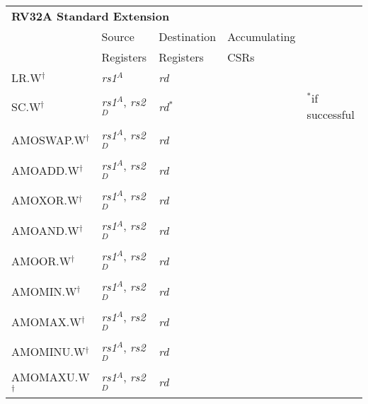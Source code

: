 \begin{tabular}{p{3cm}|p{25mm}|p{3cm}|p{4cm}|p{4cm}}
  \multicolumn{4}{l}{\bf RV32A Standard Extension} \\
  \cline{2-4}
   & Source    & Destination & Accumulating \\
   & Registers & Registers   & CSRs \\
  \cline{2-4}
   LR.W$^\dagger$ & {\em rs1}$^A$ & {\em rd} &   & \\
   \cline{2-4}
   SC.W$^\dagger$ & {\em rs1}$^A$, {\em rs2}$^D$ & {\em rd}$^*$ & & $^*$if successful  \\
   \cline{2-4}
   AMOSWAP.W$^\dagger$ & {\em rs1}$^A$, {\em rs2}$^D$ & {\em rd} &   & \\
   \cline{2-4}
   AMOADD.W$^\dagger$ & {\em rs1}$^A$, {\em rs2}$^D$ & {\em rd} &   & \\
   \cline{2-4}
   AMOXOR.W$^\dagger$ & {\em rs1}$^A$, {\em rs2}$^D$ & {\em rd} &   & \\
   \cline{2-4}
   AMOAND.W$^\dagger$ & {\em rs1}$^A$, {\em rs2}$^D$ & {\em rd} &   & \\
   \cline{2-4}
   AMOOR.W$^\dagger$ & {\em rs1}$^A$, {\em rs2}$^D$ & {\em rd} &   & \\
   \cline{2-4}
   AMOMIN.W$^\dagger$ & {\em rs1}$^A$, {\em rs2}$^D$ & {\em rd} &   & \\
   \cline{2-4}
   AMOMAX.W$^\dagger$ & {\em rs1}$^A$, {\em rs2}$^D$ & {\em rd} &   & \\
   \cline{2-4}
   AMOMINU.W$^\dagger$ & {\em rs1}$^A$, {\em rs2}$^D$ & {\em rd} &   & \\
   \cline{2-4}
   AMOMAXU.W$^\dagger$ & {\em rs1}$^A$, {\em rs2}$^D$ & {\em rd} &   & \\
   \cline{2-4}
\end{tabular}

